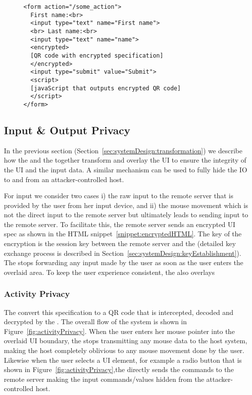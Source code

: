 \begin{figure}[t]
\small
\begin{lstlisting}[mathescape=true]
<form action="/some_action">
  First name:<br>
  <input type="text" name="First name">
  <br> Last name:<br>
  <input type="text" name="name">
  <encrypted>
  [QR code with encrypted specification]
  </encrypted>
  <input type="submit" value="Submit">
  <script>
  [javaScript that outputs encrypted QR code]
  </script>
</form> 
\end{lstlisting} 
\end{figure}


\subsection{Input \& Output Privacy}
\label{sec:systemDesign:mousePrivacy}


In the previous section (Section~\ref{sec:systemDesign:transformation}) we describe how the \name \js and the \device together transform and overlay the UI to ensure the integrity of the UI and the input data. A similar mechanism can be used to fully hide the IO to and from an attacker-controlled host. 

For input we consider two cases i) the raw input to the remote server that is provided by the user from her input device, and ii) the mouse movement which is not the direct input to the remote server but ultimately leads to sending input to the remote server. To facilitate this, the remote server sends an encrypted UI spec as shown in the HTML snippet~\ref{snippet:encryptedHTML}. The key of the encryption is the session \tls key between the remote server and the \device (detailed key exchange process is described in Section~\ref{sec:systemDesign:keyEstablishment}). The \device stops forwarding any input made by the user as soon as the user enters the overlaid area. To keep the user experience consistent, the \device also overlays  

\subsubsection{Activity Privacy}

The \name \js convert this specification to a QR code that is intercepted, decoded and decrypted by the \device. The overall flow of the system is shown in Figure~\ref{fig:activityPrivacy}. When the user enters her mouse pointer into the overlaid UI boundary, the \device stops transmitting any mouse data to the host system, making the host completely oblivious to any mouse movement done by the user. Likewise when the user selects a UI element, for example a radio button that is shown in Figure~\ref{fig:activityPrivacy},the \device directly sends the commands to the remote server making the input commands/values hidden from the attacker-controlled host.  


